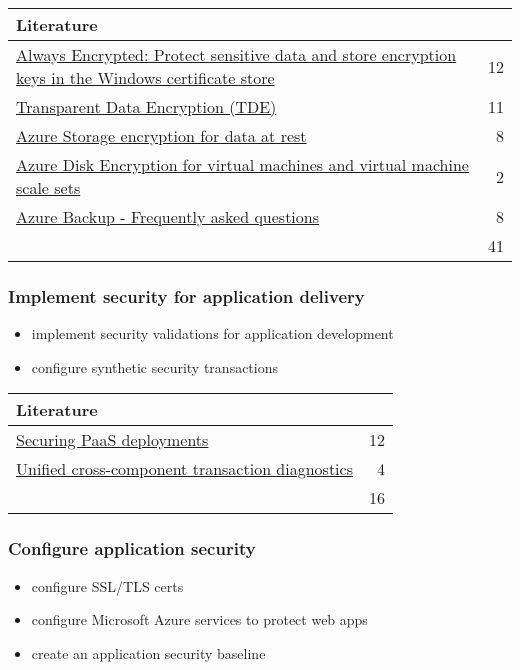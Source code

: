 \begin{tabular}{p{14cm} | r}
\textbf{Literature} & \\
\hline
\href{https://docs.microsoft.com/en-us/azure/sql-database/sql-database-always-encrypted}{Always Encrypted: Protect sensitive data and store encryption keys in the Windows certificate store} & 12 \\
\href{https://docs.microsoft.com/en-us/sql/relational-databases/security/encryption/transparent-data-encryption?view=sql-server-2017}{Transparent Data Encryption (TDE)} & 11 \\
\href{https://docs.microsoft.com/en-us/azure/storage/common/storage-service-encryption}{Azure Storage encryption for data at rest} & 8 \\
\href{https://docs.microsoft.com/en-us/azure/security/fundamentals/azure-disk-encryption-vms-vmss}{Azure Disk Encryption for virtual machines and virtual machine scale sets} & 2 \\
\href{https://docs.microsoft.com/en-us/azure/backup/backup-azure-backup-faq#encryption}{Azure Backup - Frequently asked questions} & 8 \\
\cline{2-2} 
 & 41 \\
\end{tabular}

\subsubsection{Implement security for application delivery}
\begin{itemize}
\item implement security validations for application development 
\item configure synthetic security transactions 
\end{itemize}

\begin{tabular}{p{14cm} | r}
\textbf{Literature} & \\
\hline
\href{https://docs.microsoft.com/en-us/azure/security/security-paas-deployments}{Securing PaaS deployments} & 12 \\
\href{https://docs.microsoft.com/en-us/azure/azure-monitor/app/transaction-diagnostics
}{Unified cross-component transaction diagnostics} & 4 \\
\cline{2-2} 
 & 16 \\
\end{tabular}

\subsubsection{Configure application security}
\begin{itemize}
\item configure SSL/TLS certs 
\item configure Microsoft Azure services to protect web apps 
\item create an application security baseline 
\end{itemize}

